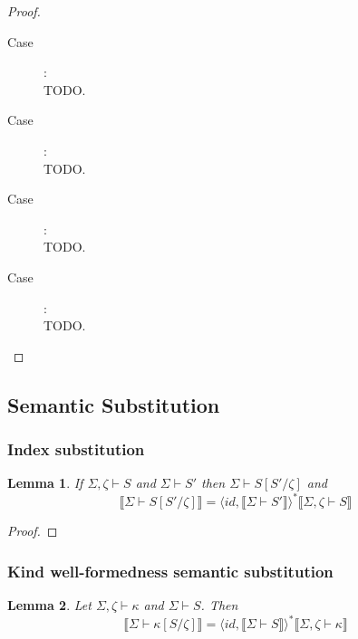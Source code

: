 \documentclass{article}
\newtheorem{lemma}{Lemma}
\newcommand{\sem}[1]{\llbracket #1 \rrbracket}
\begin{document}
\begin{proof}
\begin{description}
\item[Case \begin{sc}StrAbs\end{sc}]:~\\

TODO.

\item[Case ]:~\\

TODO.

\item[Case ]:~\\

TODO.

\item[Case ]:~\\

TODO.

\end{description}

\end{proof}

\subsection*{Semantic Substitution}

\subsubsection*{Index substitution}

\begin{lemma}
If $\Sigma,\zeta \vdash S$ and $\Sigma \vdash S'$ then $\Sigma \vdash S[S'/\zeta]$ and $$\sem{\Sigma \vdash S[S'/\zeta]} = \langle \mathit{id}, \sem{\Sigma \vdash S'} \rangle^* \sem{\Sigma,\zeta \vdash S}$$
\end{lemma}

\begin{proof}

\end{proof}

\subsubsection*{Kind well-formedness semantic substitution}

\begin{lemma}
Let $\Sigma,\zeta \vdash \kappa$ and $\Sigma \vdash S$. Then $$\sem{\Sigma \vdash \kappa[S/\zeta]} = \langle \mathit{id}, \sem{\Sigma \vdash S} \rangle^* \sem{\Sigma,\zeta \vdash \kappa}$$
\end{lemma}
\end{document}
